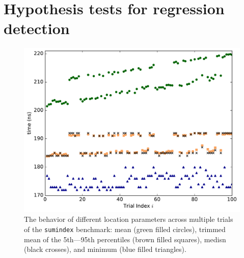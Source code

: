 \documentclass[conference]{IEEEtran}
\begin{document}

\label{sec:hypotesting}
\section{Hypothesis tests for regression detection}

\begin{figure}
\centering
\includegraphics[width=\columnwidth]{figures/fig3/location_estimators_sumindex}
\caption{The behavior of different location parameters across multiple trials of
the \lstinline|sumindex| benchmark: mean (green filled circles), trimmed mean of
the 5th---95th percentiles (brown filled squares), medisn (black crosses), and
minimum (blue filled triangles).}
\label{fig:locationmeasures}
\end{figure}
\end{document}
